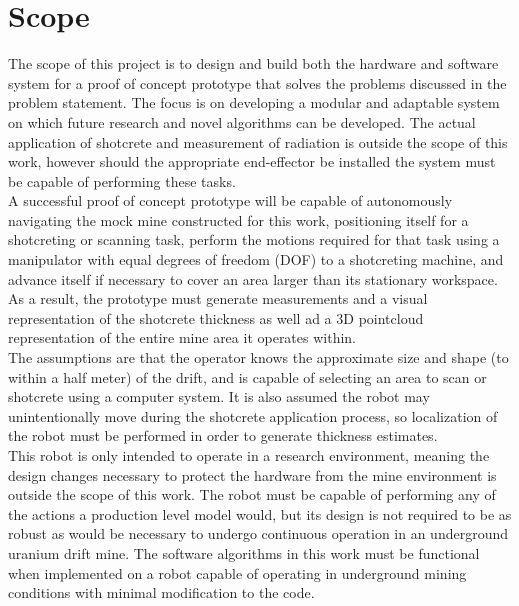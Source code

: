 \section{Scope}
\label{sec:scope}

The scope of this project is to design and build both the hardware and software system for a proof of concept prototype that solves the problems discussed in the problem statement. The focus is on developing a modular and adaptable system on which future research and novel algorithms can be developed. The actual application of shotcrete and measurement of radiation is outside the scope of this work, however should the appropriate end-effector be installed the system must be capable of performing these tasks.\\

A successful proof of concept prototype will be capable of autonomously navigating the mock mine constructed for this work, positioning itself for a shotcreting or scanning task, perform the motions required for that task using a manipulator with equal degrees of freedom (DOF) to a shotcreting machine, and advance itself if necessary to cover an area larger than its stationary workspace. As a result, the prototype must generate measurements and a visual representation of the shotcrete thickness as well ad a 3D pointcloud representation of the entire mine area it operates within.\\

The assumptions are that the operator knows the approximate size and shape (to within a half meter) of the drift, and is capable of selecting an area to scan or shotcrete using a computer system. It is also assumed the robot may unintentionally move during the shotcrete application process, so localization of the robot must be performed in order to generate thickness estimates.\\

This robot is only intended to operate in a research environment, meaning the design changes necessary to protect the hardware from the mine environment is outside the scope of this work. The robot must be capable of performing any of the actions a production level model would, but its design is not required to be as robust as would be necessary to undergo continuous operation in an underground uranium drift mine. The software algorithms in this work must be functional when implemented on a robot capable of operating in underground mining conditions with minimal modification to the code.\\

